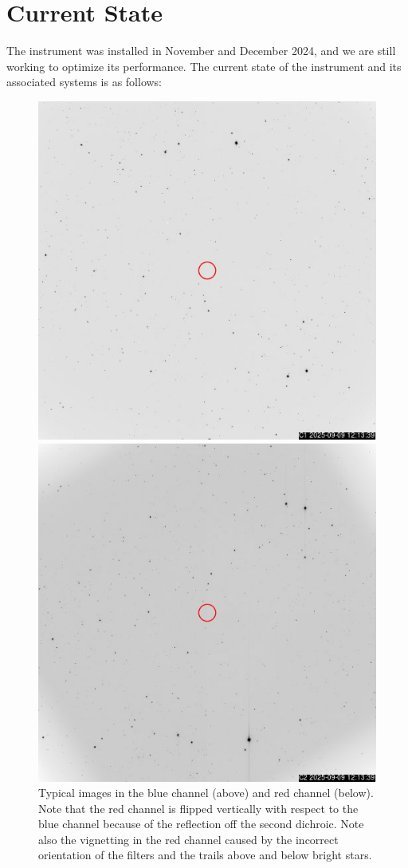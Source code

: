 \chapter{Current State}
\label{chapter:current-state}

The instrument was installed in November and December 2024, and we are still working to optimize its performance. The current state of the instrument and its associated systems is as follows:

\begin{figure}
\centering
\includegraphics[width=0.65\linewidth]{figure/C1.jpg}

\includegraphics[width=0.65\linewidth]{figure/C2.jpg}

\caption{Typical images in the blue channel (above) and red channel (below). Note that the red channel is flipped vertically with respect to the blue channel because of the reflection off the second dichroic. Note also the vignetting in the red channel caused by the incorrect orientation of the filters and the trails above and below bright stars.}
\label{figure:typical-images}
\end{figure}

